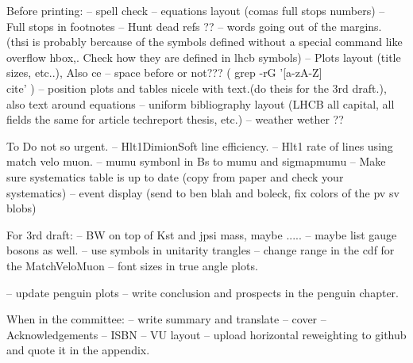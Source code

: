 Before printing:
-- spell check
-- equations layout (comas full stops numbers)
-- Full stops in footnotes
-- Hunt dead refs ??
-- words going out of the margins. (thsi is probably bercause of the symbols defined without a special command like overflow hbox,. Check how they are defined in lhcb symbols)
-- Plots layout (title sizes, etc..), Also ce
-- space before \cite{} or not??? ( grep -rG  '[a-zA-Z]\\cite' )
-- position plots and tables nicele with text.(do theis for the 3rd draft.), also text around equations
-- uniform bibliography layout (LHCB all capital, all fields the same for article techreport thesis, etc.)
-- weather wether ??

To Do not so urgent.
-- Hlt1DimionSoft line efficiency.
-- Hlt1 rate of lines using match velo muon.
-- mumu symbonl in Bs to mumu and sigmapmumu
-- Make sure systematics table is up to date (copy from paper and check your systematics)
-- event display (send to ben blah and boleck, fix colors of the pv sv blobs)

For 3rd draft:
-- BW on top of Kst and jpsi mass, maybe .....
-- maybe list gauge bosons as well.
-- use \quark symbols in unitarity trangles
-- change range in the cdf for the MatchVeloMuon
-- font sizes in true angle plots.

-- update penguin plots
-- write conclusion and prospects in the penguin chapter.

When in the committee:
-- write summary and translate
-- cover
-- Acknowledgements
-- ISBN
-- VU layout
-- upload horizontal reweighting to github and quote it in the appendix.

